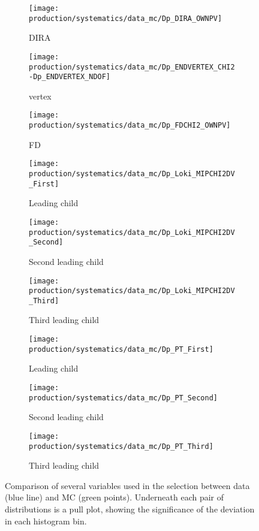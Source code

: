 \begin{figure}
  \begin{subfigure}{0.3\textwidth}
    \centering
    \texttt{[image: production/systematics/data\_mc/Dp\_DIRA\_OWNPV]}
    \caption{\PDplus \ac{DIRA}}
  \end{subfigure}
  \begin{subfigure}{0.3\textwidth}
    \centering
    \texttt{[image: production/systematics/data\_mc/Dp\_ENDVERTEX\_CHI2-Dp\_ENDVERTEX\_NDOF]}
    \caption{\PDplus vertex \chisq}
  \end{subfigure}
  \begin{subfigure}{0.3\textwidth}
    \centering
    \texttt{[image: production/systematics/data\_mc/Dp\_FDCHI2\_OWNPV]}
    \caption{\PDzero FD \chisq}
  \end{subfigure}

  \begin{subfigure}{0.3\textwidth}
    \centering
    \texttt{[image: production/systematics/data\_mc/Dp\_Loki\_MIPCHI2DV\_First]}
    \caption{Leading child \ipchisq}
  \end{subfigure}
  \begin{subfigure}{0.3\textwidth}
    \centering
    \texttt{[image: production/systematics/data\_mc/Dp\_Loki\_MIPCHI2DV\_Second]}
    \caption{Second leading child \ipchisq}
  \end{subfigure}
  \begin{subfigure}{0.3\textwidth}
    \centering
    \texttt{[image: production/systematics/data\_mc/Dp\_Loki\_MIPCHI2DV\_Third]}
    \caption{Third leading child \ipchisq}
  \end{subfigure}

  \begin{subfigure}{0.3\textwidth}
    \centering
    \texttt{[image: production/systematics/data\_mc/Dp\_PT\_First]}
    \caption{Leading child \pT}
  \end{subfigure}
  \begin{subfigure}{0.3\textwidth}
    \centering
    \texttt{[image: production/systematics/data\_mc/Dp\_PT\_Second]}
    \caption{Second leading child \pT}
  \end{subfigure}
  \begin{subfigure}{0.3\textwidth}
    \centering
    \texttt{[image: production/systematics/data\_mc/Dp\_PT\_Third]}
    \caption{Third leading child \pT}
  \end{subfigure}

  \caption{%
    Comparison of several variables used in the \DpToKpipi selection between 
    data (blue line) and \ac{MC} (green points).
    Underneath each pair of distributions is a pull plot, showing the 
    significance of the deviation in each histogram bin.
  }
  \label{fig:prod:syst:mc:DpToKpipi}
\end{figure}

